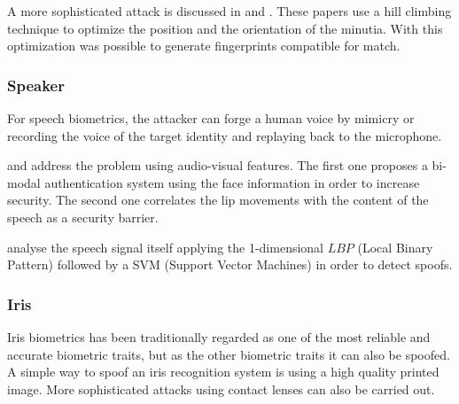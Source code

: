 A more sophisticated attack is discussed in \cite{MartinezDiaz2006} and \cite{hill2001risk}. These papers use a hill climbing technique to optimize  the position and the orientation of the minutia. With this optimization was possible to generate fingerprints compatible for match.




\subsubsection{Speaker}

For speech biometrics, the attacker can forge a human voice by mimicry or recording the voice of the target identity and replaying back to the microphone. 

\cite{chetty2004liveness} and \cite{eveno2005speaker} address the problem using audio-visual features. The first one proposes a bi-modal authentication system using the face information in order to increase security. The second one correlates the lip movements with the content of the speech as a security barrier.

\cite{QimingZhu} analyse the speech signal itself applying the 1-dimensional $LBP$ (Local Binary Pattern) followed by a SVM (Support Vector Machines) in order to detect spoofs.

\subsubsection{Iris}

Iris biometrics has been traditionally regarded as one of the most reliable and accurate biometric traits, but as the other biometric traits it can also be spoofed. A simple way to spoof an iris recognition system is using a high quality printed image. More sophisticated attacks using contact lenses can also be carried out.

